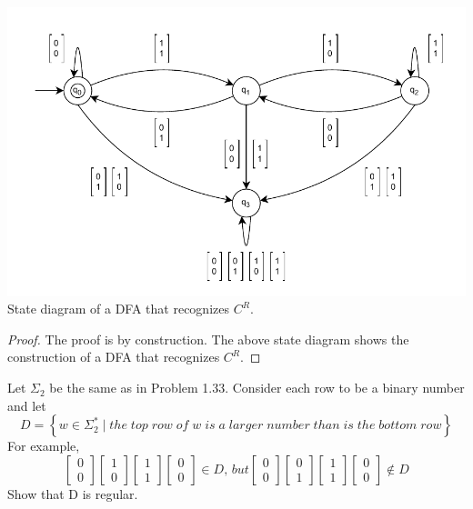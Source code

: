 \documentclass[11pt]{article}
\newenvironment{problem}[2][Problem]{\begin{trivlist}
\item[\hskip \labelsep {\bfseries #1}\hskip \labelsep {\bfseries #2.}]}{\end{trivlist}}
\begin{document}
\begin{center}
\includegraphics[scale=0.8]{Figures/Problem1.33.pdf} \\
State diagram of a DFA that recognizes $C^{R}$.
\end{center}

\begin{proof}
The proof is by construction. The above state diagram shows the construction of a DFA that recognizes $C^{R}$.
\end{proof}

\begin{problem}{1.34}
Let $\Sigma_{2}$ be the same as in Problem 1.33. Consider each row to be a binary number and let
\[
D = 
\left\{
w \in \Sigma_{2}^{*} \; | \; the \; top \; row \; of \; w \; is \; a \; larger \; number \; than \; is \; the \; bottom \; row
\right\}
\]
For example,
\[
\begin{bmatrix}
    0 \\
    0
\end{bmatrix}
\begin{bmatrix}
    1 \\
    0
\end{bmatrix}
\begin{bmatrix}
    1 \\
    1
\end{bmatrix}
\begin{bmatrix}
    0 \\
    0
\end{bmatrix} \in D, \, but
\begin{bmatrix}
    0 \\
    0
\end{bmatrix}
\begin{bmatrix}
    0 \\
    1
\end{bmatrix}
\begin{bmatrix}
    1 \\
    1
\end{bmatrix}
\begin{bmatrix}
    0 \\
    0
\end{bmatrix} \not\in D
\]
Show that D is regular.
\end{problem}
\end{document}
